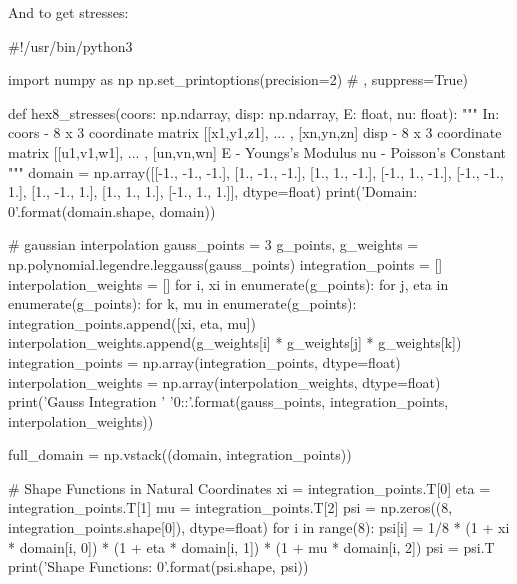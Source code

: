 And to get stresses:
\begin{python}
#!/usr/bin/python3

import numpy as np
np.set_printoptions(precision=2) # , suppress=True)

def hex8_stresses(coors: np.ndarray,
                  disp: np.ndarray,
                  E: float,
                  nu: float):
    """
    In:
        coors - 8 x 3 coordinate matrix
                [[x1,y1,z1], ... , [xn,yn,zn]
        disp  - 8 x 3 coordinate matrix
                [[u1,v1,w1], ... , [un,vn,wn]
        E     - Youngs's Modulus
        nu    - Poisson's Constant
    """
    domain = np.array([[-1., -1., -1.],
                       [1., -1., -1.],
                       [1., 1., -1.],
                       [-1., 1., -1.],
                       [-1., -1., 1.],
                       [1., -1., 1.],
                       [1., 1., 1.],
                       [-1., 1., 1.]], dtype=float)
    print('Domain: {0}'.format(domain.shape, domain))

    # gaussian interpolation
    gauss_points = 3
    g_points, g_weights = np.polynomial.legendre.leggauss(gauss_points)
    integration_points = []
    interpolation_weights = []
    for i, xi in enumerate(g_points):
        for j, eta in enumerate(g_points):
            for k, mu in enumerate(g_points):
                integration_points.append([xi, eta, mu])
                interpolation_weights.append(g_weights[i] *
                                             g_weights[j] *
                                             g_weights[k])
    integration_points = np.array(integration_points, dtype=float)
    interpolation_weights = np.array(interpolation_weights, dtype=float)
    print('Gauss Integration '
          '{0}:\nWeights:'.format(gauss_points,
                                            integration_points,
                                            interpolation_weights))

    full_domain = np.vstack((domain, integration_points))

    # Shape Functions in Natural Coordinates
    xi = integration_points.T[0]
    eta = integration_points.T[1]
    mu = integration_points.T[2]
    psi = np.zeros((8, integration_points.shape[0]), dtype=float)
    for i in range(8):
        psi[i] = 1/8 * (1 + xi * domain[i, 0]) *
                       (1 + eta * domain[i, 1]) *
                       (1 + mu * domain[i, 2])
    psi = psi.T
    print('Shape Functions: {0}'.format(psi.shape, psi))


\end{python}

